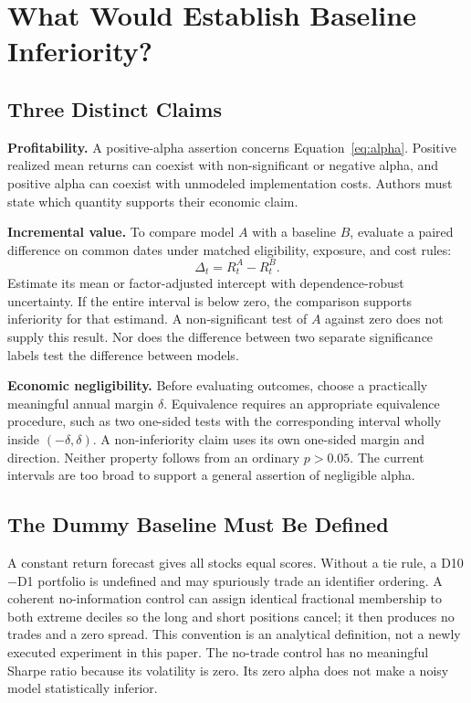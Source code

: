 \documentclass{article}
\begin{document}
\section{What Would Establish Baseline Inferiority?}
\subsection{Three Distinct Claims}
\textbf{Profitability.} A positive-alpha assertion concerns Equation~\ref{eq:alpha}. Positive realized mean returns can coexist with non-significant or negative alpha, and positive alpha can coexist with unmodeled implementation costs. Authors must state which quantity supports their economic claim.

\textbf{Incremental value.} To compare model $A$ with a baseline $B$, evaluate a paired difference on common dates under matched eligibility, exposure, and cost rules:
\begin{equation}
\Delta_t=R^A_t-R^B_t.
\end{equation}
Estimate its mean or factor-adjusted intercept with dependence-robust uncertainty. If the entire interval is below zero, the comparison supports inferiority for that estimand. A non-significant test of $A$ against zero does not supply this result. Nor does the difference between two separate significance labels test the difference between models.

\textbf{Economic negligibility.} Before evaluating outcomes, choose a practically meaningful annual margin $\delta$. Equivalence requires an appropriate equivalence procedure, such as two one-sided tests with the corresponding interval wholly inside $(-\delta,\delta)$. A non-inferiority claim uses its own one-sided margin and direction. Neither property follows from an ordinary $p>0.05$. The current intervals are too broad to support a general assertion of negligible alpha.

\subsection{The Dummy Baseline Must Be Defined}
A constant return forecast gives all stocks equal scores. Without a tie rule, a D10$-$D1 portfolio is undefined and may spuriously trade an identifier ordering. A coherent no-information control can assign identical fractional membership to both extreme deciles so the long and short positions cancel; it then produces no trades and a zero spread. This convention is an analytical definition, not a newly executed experiment in this paper. The no-trade control has no meaningful Sharpe ratio because its volatility is zero. Its zero alpha does not make a noisy model statistically inferior.
\end{document}
